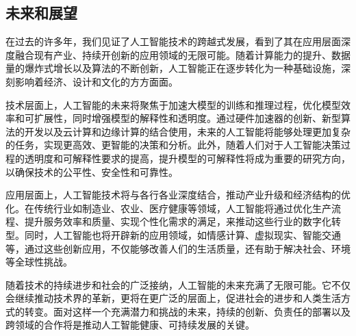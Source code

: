 \subsection[未来和展望]{未来和展望}

在过去的许多年，我们见证了人工智能技术的跨越式发展，看到了其在应用层面深度融合现有产业、持续开创新的应用领域的无限可能。随着计算能力的提升、数据量的爆炸式增长以及算法的不断创新，人工智能正在逐步转化为一种基础设施，深刻影响着经济、设计和文化的方方面面。

技术层面上，人工智能的未来将聚焦于加速大模型的训练和推理过程，优化模型效率和可扩展性，同时增强模型的解释性和透明度。通过硬件加速器的创新、新型算法的开发以及云计算和边缘计算的结合使用，未来的人工智能将能够处理更加复杂的任务，实现更高效、更智能的决策和分析。此外，随着人们对于人工智能决策过程的透明度和可解释性要求的提高，提升模型的可解释性将成为重要的研究方向，以确保技术的公平性、安全性和可靠性。

应用层面上，人工智能技术将与各行各业深度结合，推动产业升级和经济结构的优化。在传统行业如制造业、农业、医疗健康等领域，人工智能将通过优化生产流程、提升服务效率和质量、实现个性化需求的满足，来推动这些行业的数字化转型。同时，人工智能也将开辟新的应用领域，如情感计算、虚拟现实、智能交通等，通过这些创新应用，不仅能够改善人们的生活质量，还有助于解决社会、环境等全球性挑战。

随着技术的持续进步和社会的广泛接纳，人工智能的未来充满了无限可能。它不仅会继续推动技术界的革新，更将在更广泛的层面上，促进社会的进步和人类生活方式的转变。面对这样一个充满潜力和挑战的未来，持续的创新、负责任的部署以及跨领域的合作将是推动人工智能健康、可持续发展的关键。

